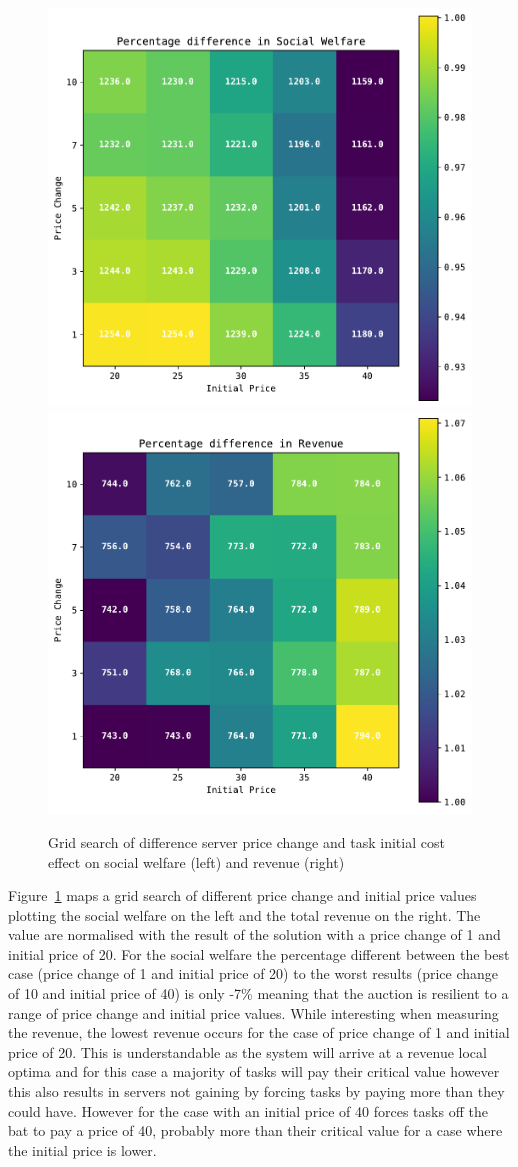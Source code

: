 \begin{figure}[h]
    \centering
    \includegraphics[width=0.45\linewidth]{figs/dia_heuristics/social_welfare_grid.pdf}
    \includegraphics[width=0.45\linewidth]{figs/dia_heuristics/revenue_grid.pdf}
    \caption{Grid search of difference server price change and task initial cost effect on social welfare (left) and
             revenue (right)}
    \label{fig:dia-sw-rev-grid-search}
\end{figure}

Figure~\ref{fig:dia-sw-rev-grid-search} maps a grid search of different price change and initial price values plotting
the social welfare on the left and the total revenue on the right. The value are normalised with the result of the
solution with a price change of 1 and initial price of 20. For the social welfare the percentage different between the
best case (price change of 1 and initial price of 20) to the worst results (price change of 10 and initial price of 40)
is only -7\% meaning that the auction is resilient to a range of price change and initial price values. While
interesting when measuring the revenue, the lowest revenue occurs for the case of price change of 1 and initial price
of 20. This is understandable as the system will arrive at a revenue local optima and for this case a majority of
tasks will pay their critical value however this also results in servers not gaining by forcing tasks by paying more
than they could have. However for the case with an initial price of 40 forces tasks off the bat to pay a price of 40,
probably more than their critical value for a case where the initial price is lower.

